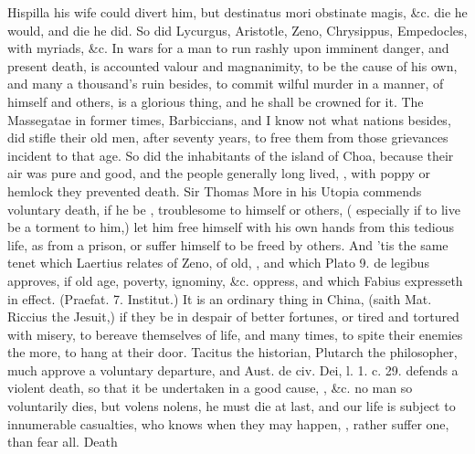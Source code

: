 Hispilla his wife could divert him, but destinatus mori obstinate
magis, \&c. die he would, and die he did. So did Lycurgus, Aristotle,
Zeno, Chrysippus, Empedocles, with myriads, \&c. In wars for a man to
run rashly upon imminent danger, and present death, is accounted valour
and magnanimity, to be the cause of his own, and many a
thousand's ruin besides, to commit wilful murder in a manner, of
himself and others, is a glorious thing, and he shall be crowned for
it. The  Massegatae in former times, Barbiccians, and I
know not what nations besides, did stifle their old men, after seventy
years, to free them from those grievances incident to that age. So did
the inhabitants of the island of Choa, because their air was pure and
good, and the people generally long lived, , with poppy or hemlock they prevented death. Sir Thomas More in
his Utopia commends voluntary death, if he be ,
troublesome to himself or others, ( especially if to live be a
torment to him,) let him free himself with his own hands from this
tedious life, as from a prison, or suffer himself to be freed by
others. And 'tis the same tenet which Laertius relates of Zeno,
of old, , and which
Plato 9. \textlatin{de legibus} approves, if old age, poverty, ignominy, \&c.
oppress, and which Fabius expresseth in effect. (Praefat. 7. Institut.)
 It is an ordinary thing in China, (saith
Mat. Riccius the Jesuit,) if they be in despair of better
fortunes, or tired and tortured with misery, to bereave themselves of
life, and many times, to spite their enemies the more, to hang at their
door. Tacitus the historian, Plutarch the philosopher, much approve a
voluntary departure, and Aust. de civ. Dei, l. 1. c. 29. defends a
violent death, so that it be undertaken in a good cause, ,  \&c. no man so voluntarily dies, but volens nolens,
he must die at last, and our life is subject to innumerable casualties,
who knows when they may happen, ,  rather suffer one, than fear all. Death
